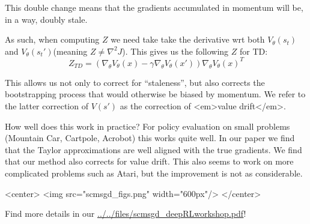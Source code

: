 This double change means that the gradients accumulated in momentum will be, in a way, doubly stale. 

As such, when computing $Z$ we need take take the derivative wrt both $V_\theta(s_t)$ and $V_\theta(s_t')$(meaning $Z\neq \nabla^2 J$). This gives us the following $Z$ for TD:
$$Z_{TD}=(\nabla_{\theta}V_{\theta}(x)-\gamma\nabla_{\theta}V_{\theta}(x'))\nabla_{\theta}V_{\theta}(x)^T$$

This allows us not only to correct for ``staleness'', but also corrects the bootstrapping process that would otherwise be biased by momentum. We refer to the latter correction of $V(s')$ as the correction of <em>value drift</em>.

How well does this work in practice? For policy evaluation on small problems (Mountain Car, Cartpole, Acrobot) this works quite well. In our paper we find that the Taylor approximations are well aligned with the true gradients. We find that our method also corrects for value drift. This also seems to work on more complicated problems such as Atari, but the improvement is not as considerable.

<center> <img src="scmsgd_figs.png" width="600px"/> </center>

Find more details in our \href{paper}{../../files/scmsgd_deepRLworkshop.pdf}!